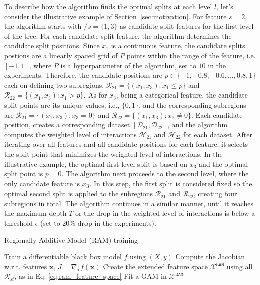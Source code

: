 \documentclass[runningheads]{llncs}
\newcommand{\xb}{\mathbf{x}}
\newcommand{\Xcal}{\mathcal{X}}
\begin{document}
To describe how the algorithm finds the optimal splits at each level $l$, let's consider the illustrative example of Section~\ref{sec:motivation}.
For feature $s=2$, the algorithm starts with $/s = \{1, 3\}$ as candidate split-features for the first level of the tree.
For each candidate split-feature, the algorithm determines the candidate split positions.
Since $x_1$ is a continuous feature, the candidate splits postions are a linearly spaced grid of $P$ points within the range of the feature, i.e. $[-1, 1]$,
where $P$ is a hyperparameter of the algorithm, set to $10$ in the experiments.
Therefore, the candidate positions are $p \in \{-1, -0.8, -0.6, \ldots, 0.8, 1\}$ each on defining two subregions,
$\mathcal{R}_{21} = \{ (x_1, x_3) : x_1 \leq p \}$ and $\mathcal{R}_{22} = \{ (x_1, x_3) : x_1 > p \}$.
As for $x_3$, being a categorical feature, the candidate split points are its unique values, i.e., $\{0, 1\}$,
and the corresponding subregions are $\mathcal{R}_{21} = \{ (x_1, x_3) : x_3 = 0 \}$ and $\mathcal{R}_{22} = \{ (x_1, x_3) : x_3 \neq 0 \}$.
Each candidate position, creates a corresponding dataset $[\mathcal{D}_{21}, \mathcal{D}_{22}]$,
and the algorithm computes the weighted level of interactions $\mathcal{H}_{21}$ and $\mathcal{H}_{22}$ for each dataset.
After iterating over all features and all candidate positions for each feature,
it selects the split point that minimizes the weighted level of interactions.
In the illustrative example, the optimal first-level split is based on $x_3$ and the optimal split point is $p = 0$.
The algorithm next proceeds to the second level, where the only candidate feature is $x_3$.
In this step, the first split is considered fixed so the optimal second split is applied to the subregions $\mathcal{R}_{21}$ and $\mathcal{R}_{22}$,
creating four subregions in total.
The algorithm continues in a similar manner, until it reaches the maximum depth $T$ or the drop in the weighted level of interactions is below a threshold $\epsilon$ (set to $20\%$ drop in the experiments).


\begin{algorithm}
\caption{Regionally Additive Model (RAM) training}
\label{alg:ram}
\SetAlgoLined
{}
\BlankLine
{}
  \BlankLine
  Train a differentiable black box model $f$ using $(X, y)$\;
  Compute the Jacobian w.r.t. features $\xb$,  $J = \nabla_{\xb}f(\xb)$ \;
  Create the extended feature space $\mathcal{X}^{\mathtt{RAM}}$ using all
  $\mathcal{R}_{st}$, as in Eq. \eqref{eq:ram_feature_space} \;
  Fit a GAM in $\mathcal{X}^{\mathtt{RAM}}$ 
  \Return{$f^{\mathtt{RAM}}(\xb) = c + \sum_{s,t} f_{st}(x_{st}), \quad \xb \in \Xcal^{\mathtt{RAM}}$}
\end{algorithm}
\end{document}
